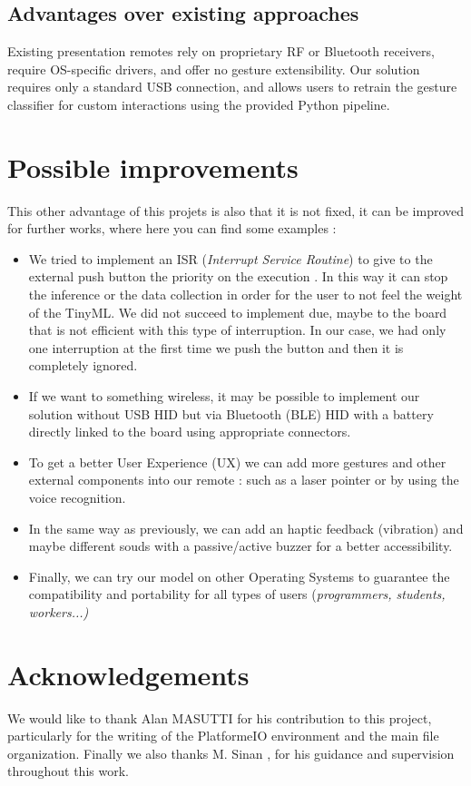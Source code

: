\documentclass[sigconf,10pt,nonacm]{acmart}
\def\\{}%
\begin{document}
\subsection*{Advantages over existing approaches}
Existing presentation remotes rely on proprietary RF or Bluetooth receivers, 
require OS-specific drivers, and offer no gesture extensibility. Our solution 
requires only a standard USB connection,  and allows users to retrain the gesture classifier for custom interactions using the provided Python pipeline.

\section{Possible improvements} 
This other advantage of this projets is also that it is not fixed, it can be improved for further works, where here you can find some examples : 

\begin{itemize} 
	\item We tried to implement an ISR (\textit{Interrupt Service Routine}) to give to the external push button the priority on the execution . In this way it can stop the inference or the data collection in order for the user to not feel the weight of the TinyML. We did not succeed to implement due, maybe to the board that is not efficient with this type of interruption. In our case, we had only one interruption at the first time we push the button and then it is completely ignored. \\
	\item If we want to something wireless, it may be possible to implement our solution without USB HID but via Bluetooth (BLE) HID with a battery directly linked to the board using appropriate connectors. \\
	\item To get a better User Experience (UX) we can add more gestures and other external components into our remote : such as a laser pointer or by using the voice recognition. \\
	\item In the same way as previously, we can add an haptic feedback (vibration) and maybe different souds with a passive/active buzzer for a better accessibility. \\
	\item Finally, we can try our model on other Operating Systems to guarantee the compatibility and portability for all types of users (\textit{programmers, students, workers...) } 
	
\end{itemize}


\section*{Acknowledgements}
We would like to thank Alan MASUTTI for his  
contribution to this project, particularly for the writing of the PlatformeIO environment and the main file organization. 
Finally we also thanks M. Sinan , for his  guidance and supervision throughout this work.



\end{document}
